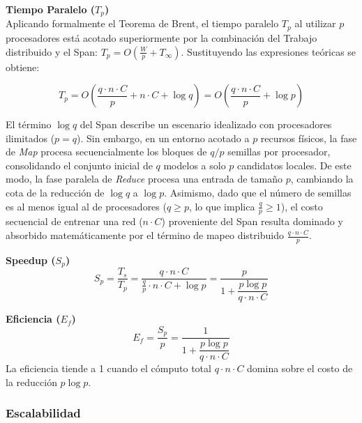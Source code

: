 \documentclass[11pt, a4paper]{article}
\begin{document}
\textbf{Tiempo Paralelo ($T_p$)} \\
Aplicando formalmente el Teorema de Brent, el tiempo paralelo $T_p$ al utilizar $p$ procesadores está acotado superiormente por la combinación del Trabajo distribuido y el Span: $T_p = O\left(\frac{W}{p} + T_\infty\right)$. Sustituyendo las expresiones teóricas se obtiene:

$$T_p = O\left(\frac{q \cdot n \cdot C}{p} + n \cdot C + \log q\right) = O\left(\frac{q \cdot n \cdot C}{p} + \log p\right)$$

El término $\log q$ del Span describe un escenario idealizado con procesadores ilimitados ($p = q$). Sin embargo, en un entorno acotado a $p$ recursos físicos, la fase de \textit{Map} procesa secuencialmente los bloques de $q/p$ semillas por procesador, consolidando el conjunto inicial de $q$ modelos a solo $p$ candidatos locales. De este modo, la fase paralela de \textit{Reduce} procesa una entrada de tamaño $p$, cambiando la cota de la reducción de $\log q$ a $\log p$. Asimismo, dado que el número de semillas es al menos igual al de procesadores ($q \ge p$, lo que implica $\frac{q}{p} \ge 1$), el costo secuencial de entrenar una red ($n \cdot C$) proveniente del Span resulta dominado y absorbido matemáticamente por el término de mapeo distribuido $\frac{q \cdot n \cdot C}{p}$.

\textbf{Speedup ($S_p$)} \\
$$S_p = \frac{T_s}{T_p} = \frac{q \cdot n \cdot C}{\frac{q}{p} \cdot n \cdot C + \log p} = \frac{p}{1 + \dfrac{p \log p}{q \cdot n \cdot C}}$$

\textbf{Eficiencia ($E_f$)} \\
$$E_f = \frac{S_p}{p} = \frac{1}{1 + \dfrac{p \log p}{q \cdot n \cdot C}}$$
La eficiencia tiende a 1 cuando el cómputo total $q \cdot n \cdot C$ domina sobre el costo de la reducción $p \log p$.

\subsubsection{Escalabilidad}
\end{document}
